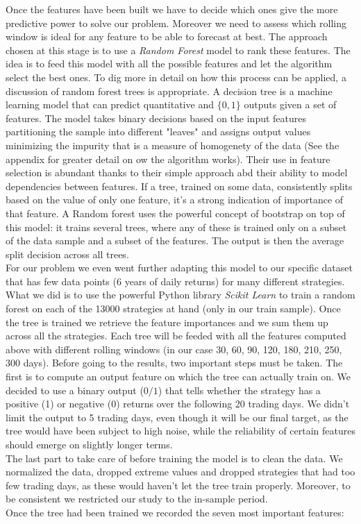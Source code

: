 \documentclass[a4paper]{article}
\numberwithin{equation}{subsection}
\begin{document}
Once the features have been built we have to decide which ones give the more predictive power to solve our problem. Moreover we need to assess which rolling window is ideal for any feature to be able to forecast at best. The approach chosen at this stage is to use a \textit{Random Forest} model to rank these features. The idea is to feed this model with all the possible features and let the algorithm select the best ones. To dig more in detail on how this process can be applied, a discussion of random forest trees is appropriate. A decision tree is a machine learning model that can predict quantitative and $\{0,1\}$ outputs given a set of features. The model takes binary decisions based on the input features partitioning the sample into different "leaves" and assigns output values minimizing the impurity that is a measure of homogenety of the data (See the appendix for greater detail on ow the algorithm works). Their use in feature selection is abundant thanks to their simple approach abd their ability to model dependencies between features. If a tree, trained on some data, consistently splits based on the value of only one feature, it's a strong indication of importance of that feature. A Random forest uses the powerful concept of bootstrap on top of this model: it trains several trees, where any of these is trained only on a subset of the data sample and a subset of the features. The output is then the average split decision across all trees.\\
For our problem we even went further adapting this model to our specific dataset that has few data points (6 years of daily returns) for many different strategies. What we did is to use the powerful Python library \textit{Scikit Learn} to train a random forest on each of the 13000 strategies at hand (only in our train sample). Once the tree is trained we retrieve the feature importances and we sum them up across all the strategies. Each tree will be feeded with all the features computed above with different rolling windows (in our case 30, 60, 90, 120, 180, 210, 250, 300 days). Before going to the results, two important steps must be taken. The first is to compute an output feature on which the tree can actually train on. We decided to use a binary output ($0/1$) that tells whether the strategy has a positive (1) or negative (0) returns over the following  20 trading days. We didn't limit the output to 5 trading days, even though it will be our final target, as the tree would have been subject to high noise, while the reliability of certain features should emerge on slightly longer terms.\\
The last part to take care of before training the model is to clean the data. We normalized the data, dropped extreme values and dropped strategies that had too few trading days, as these would haven't let the tree train properly. Moreover, to be consistent we restricted our study to the in-sample period.\\
Once the tree had been trained we recorded the seven most important features: 
\end{document}
